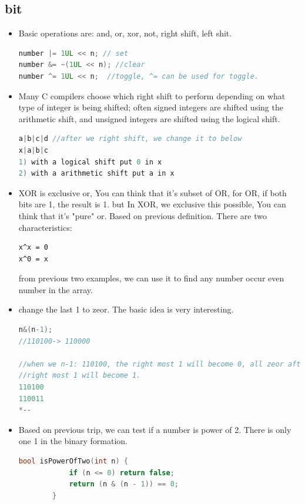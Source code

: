 \documentclass[a4paper,11pt,twoside]{book}
\begin{document}
\subsection{bit}
\begin{itemize}
	\item Basic operations are: and, or, xor, not, right shift, left shit. 
\begin{lstlisting}[frame=single, language=c++]	
number |= 1UL << n; // set
number &= ~(1UL << n); //clear
number ^= 1UL << n;  //toggle, ^= can be used for toggle. 
\end{lstlisting}

	\item Many C compilers choose which right shift to perform depending on what type of integer is being shifted; often signed integers are shifted using the arithmetic shift, and unsigned integers are shifted using the logical shift.
	
\begin{lstlisting}[frame=single, language=c++]	
a|b|c|d //after we right shift, we change it to below
x|a|b|c
1) with a logical shift put 0 in x
2) with a arithmetic shift put a in x
\end{lstlisting}	
	
	\item XOR is exclusive or, You can think that it's subset of OR, for OR, if both bits are 1, the result is 1. but In XOR, we exclusive this possible,  You can think that it's "pure" or.  Based on previous definition. There are two characteristics:
\begin{lstlisting}
x^x = 0
x^0 = x
\end{lstlisting}
	from previous two examples, we can use it to find any number occur even number in the array. 
		
	\item change the last 1 to zeor. The basic idea is very interesting. 
\begin{lstlisting}[frame=single, language=c++]	
n&(n-1);
//110100-> 110000

//when we n-1: 110100, the right most 1 will become 0, all zeor after 
//right most 1 will become 1. 
110100
110011
*--	
\end{lstlisting}	
	
	\item Based on previous trip, we can test if a number is power of 2. There is only one 1 in the binary formation.
	\begin{lstlisting}[frame=single, language=c++]	
		bool isPowerOfTwo(int n) {
			if (n <= 0) return false;
			return (n & (n - 1)) == 0;
		}	
	\end{lstlisting}
	

\end{itemize}
\end{document}
